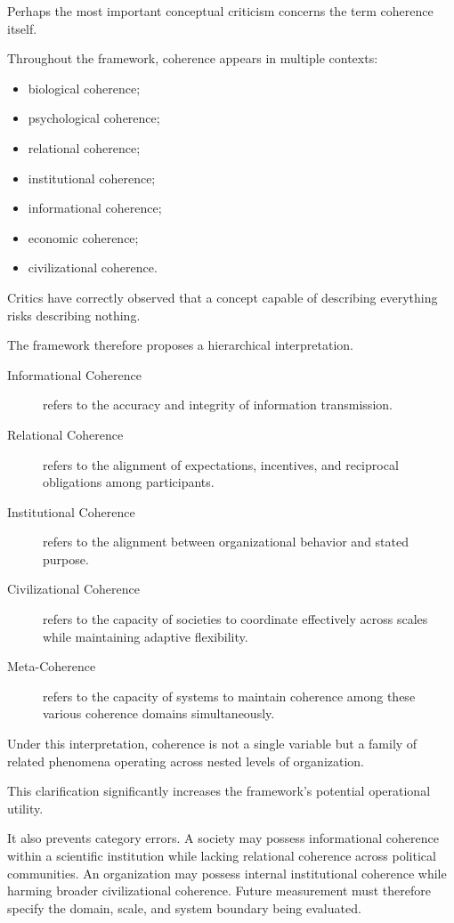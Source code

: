 \documentclass[12pt]{article}
\begin{document}
Perhaps the most important conceptual criticism concerns the term coherence itself.

Throughout the framework, coherence appears in multiple contexts:

\begin{itemize}
  \item biological coherence;
  \item psychological coherence;
  \item relational coherence;
  \item institutional coherence;
  \item informational coherence;
  \item economic coherence;
  \item civilizational coherence.
\end{itemize}

Critics have correctly observed that a concept capable of describing everything risks describing nothing.

The framework therefore proposes a hierarchical interpretation.

\begin{description}
  \item[Informational Coherence] refers to the accuracy and integrity of information transmission.
  \item[Relational Coherence] refers to the alignment of expectations, incentives, and reciprocal obligations among participants.
  \item[Institutional Coherence] refers to the alignment between organizational behavior and stated purpose.
  \item[Civilizational Coherence] refers to the capacity of societies to coordinate effectively across scales while maintaining adaptive flexibility.
  \item[Meta-Coherence] refers to the capacity of systems to maintain coherence among these various coherence domains simultaneously.
\end{description}

Under this interpretation, coherence is not a single variable but a family of related phenomena operating across nested levels of organization.

This clarification significantly increases the framework's potential operational utility.

It also prevents category errors. A society may possess informational coherence within a scientific institution while lacking relational coherence across political communities. An organization may possess internal institutional coherence while harming broader civilizational coherence. Future measurement must therefore specify the domain, scale, and system boundary being evaluated.
\end{document}
